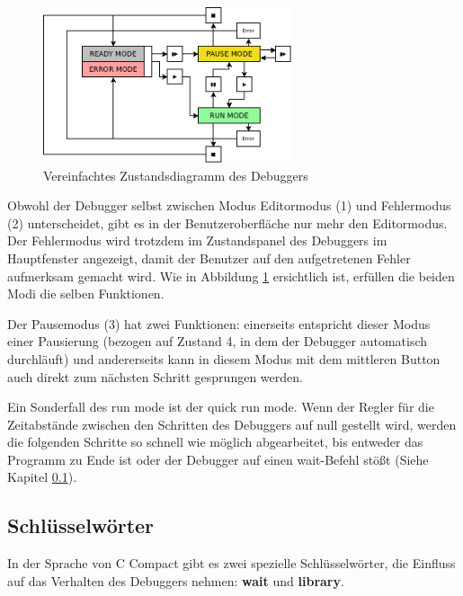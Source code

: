 \begin{figure}[h]
\centering
\includegraphics[width=0.65\textwidth]{./media/images/gui/debugger/RunModes_Simple.png}
\caption{Vereinfachtes Zustandsdiagramm des Debuggers}
\label{fig:deb-zust-simple}
\end{figure}

Obwohl der Debugger selbst zwischen Modus Editormodus (1) und Fehlermodus (2) unterscheidet, gibt es in der Benutzeroberfläche nur mehr den Editormodus. Der Fehlermodus wird trotzdem im Zustandspanel des Debuggers im Hauptfenster angezeigt, damit der Benutzer auf den aufgetretenen Fehler aufmerksam gemacht wird. Wie in Abbildung \ref{fig:deb-zust-simple} ersichtlich ist, erfüllen die beiden Modi die selben Funktionen.

Der Pausemodus (3) hat zwei Funktionen: einerseits entspricht dieser Modus einer Pausierung (bezogen auf Zustand 4, in dem der Debugger automatisch durchläuft) und andererseits kann in diesem Modus mit dem mittleren Button auch direkt zum nächsten Schritt gesprungen werden.

Ein Sonderfall des run mode ist der \glqq{}quick run mode\grqq{}. Wenn der Regler für die Zeitabstände zwischen den Schritten des Debuggers auf null gestellt wird, werden die folgenden Schritte so schnell wie möglich abgearbeitet, bis entweder das Programm zu Ende ist oder der Debugger auf einen \glqq{}wait\grqq{}-Befehl stößt (Siehe Kapitel \ref{}).



\subsection{Schlüsselwörter}
In der Sprache von C Compact gibt es zwei spezielle Schlüsselwörter, die Einfluss auf das Verhalten des Debuggers nehmen: \textbf{wait} und \textbf{library}.

